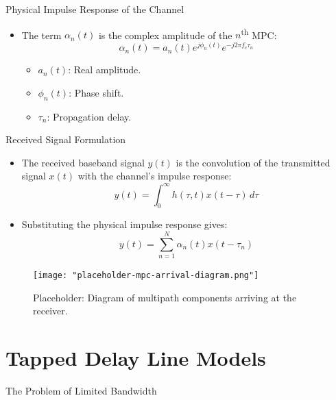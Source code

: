 \documentclass{beamer}
\begin{document}
	\begin{frame}{Physical Impulse Response of the Channel}
		\begin{itemize}
			\item The term $\alpha_n(t)$ is the complex amplitude of the $n$\textsuperscript{th} MPC:
			\[
			\alpha_n(t) = a_n(t) e^{j\phi_n(t)} e^{-j2\pi f_c \tau_n}
			\]
			\begin{itemize}
				\item $a_n(t)$: Real amplitude.
				\item $\phi_n(t)$: Phase shift.
				\item $\tau_n$: Propagation delay.
			\end{itemize}
		\end{itemize}
	\end{frame}
	
	\begin{frame}{Received Signal Formulation}
		\begin{itemize}
			\item The received baseband signal $y(t)$ is the convolution of the transmitted signal $x(t)$ with the channel's impulse response:
			\[
			y(t) = \int_0^{\infty} h(\tau, t) x(t - \tau) \, d\tau
			\]
			\item Substituting the physical impulse response gives:
			\[
			y(t) = \sum_{n=1}^{N} \alpha_n(t) x(t - \tau_n)
			\]
		\end{itemize}
		\begin{figure}
			\centering
			\texttt{[image: "placeholder-mpc-arrival-diagram.png"]}
			\caption{Placeholder: Diagram of multipath components arriving at the receiver.}
		\end{figure}
	\end{frame}
	
	
	\section{Tapped Delay Line Models}
	
	\begin{frame}{The Problem of Limited Bandwidth}
		\centering
	\end{frame}
	
\end{document}
